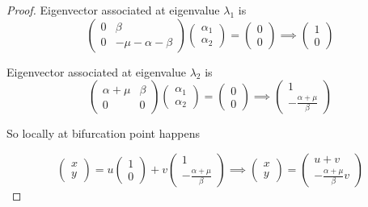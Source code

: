 \begin{proof}
Eigenvector associated at eigenvalue $\lambda_1$ is
\begin{equation}
    \begin{pmatrix}
        0 & \beta \\ 0 & -\mu-\alpha-\beta
    \end{pmatrix}
    \begin{pmatrix}
        \alpha_1 \\ \alpha_2
    \end{pmatrix} =
    \begin{pmatrix}
        0 \\ 0
    \end{pmatrix}
    \implies
    \begin{pmatrix}
        1 \\ 0
    \end{pmatrix}
\end{equation}

Eigenvector associated at eigenvalue $\lambda_2$ is
\begin{equation}
    \begin{pmatrix}
        \alpha+\mu & \beta \\ 0 & 0
    \end{pmatrix}
    \begin{pmatrix}
        \alpha_1 \\ \alpha_2
    \end{pmatrix} =
    \begin{pmatrix}
        0 \\ 0
    \end{pmatrix}
    \implies
    \begin{pmatrix}
        1 \\ -\frac{\alpha+\mu}{\beta}
    \end{pmatrix}
\end{equation}

So locally at bifurcation point happens

\begin{equation}
    \label{eq:uv}
    \begin{pmatrix} x \\ y \end{pmatrix}
    = u
    \begin{pmatrix} 1 \\ 0 \end{pmatrix} + v
    \begin{pmatrix} 1 \\ -\frac{\alpha + \mu}{\beta}\end{pmatrix}
    \implies \begin{pmatrix} x \\ y \end{pmatrix}
    = \begin{pmatrix} u + v \\ -\frac{\alpha + \mu}{\beta} v \end{pmatrix}
\end{equation}


\end{proof}
